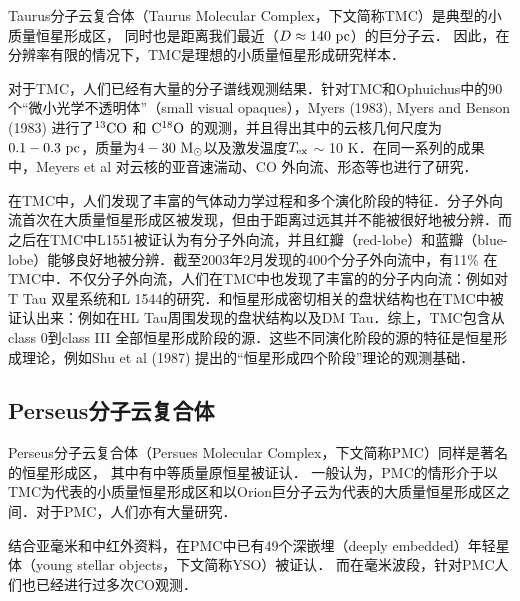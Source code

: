 \documentclass[UTF8, nocolorlinks]{pkuthss}
\newcommand{\cob}{$\rm ^{13}CO$ }
\newcommand{\coc}{$\rm C^{18}O$ }
\newcommand{\texc}{$T_{\rm {ex}}$ }
\begin{document}
			Taurus分子云复合体（Taurus Molecular Complex，下文简称TMC）是典型的小质量恒星形成区， 同时也是距离我们最近（$D\approx 140\rm\ pc$）的巨分子云\supercite{1987ApJ...322..706D}． 因此，在分辨率有限的情况下，TMC是理想的小质量恒星形成研究样本．

			对于TMC，人们已经有大量的分子谱线观测结果．针对TMC和Ophuichus中的90个“微小光学不透明体”（small visual opaques），Myers (1983), Myers and Benson (1983) 进行了\cob 和 \coc 的观测，并且得出其中的云核几何尺度为$0.1-0.3 \ \rm pc$，质量为$4-30\ \rm M_\odot$以及激发温度\texc $\sim$ 10 K\supercite{1983ApJ...264..517M,1983ApJ...266..309M}．在同一系列的成果中，Meyers et al 对云核的亚音速湍动、CO 外向流、形态等也进行了研究\supercite{1983ApJ...270..105M,1988ApJ...324..907M,1991ApJ...376..561M}．

			在TMC中，人们发现了丰富的气体动力学过程和多个演化阶段的特征．分子外向流首次在大质量恒星形成区被发现，但由于距离过远其并不能被很好地被分辨\supercite{1976ApJ...209L.137Z}．而之后在TMC中L1551被证认为有分子外向流，并且红瓣（red-lobe）和蓝瓣（blue-lobe）能够良好地被分辨\supercite{1980ApJ...239L..17S}．截至2003年2月发现的400个分子外向流中，有11\% 在TMC中\supercite{2004A&A...426..503W}．不仅分子外向流，人们在TMC中也发现了丰富的的分子内向流：例如对T Tau 双星系统\supercite{1994ApJ...425L..45V}和L 1544的研究\supercite{1998ApJ...504..900T}．和恒星形成密切相关的盘状结构也在TMC中被证认出来：例如在HL Tau周围发现的盘状结构\supercite{1991ApJ...382L..31S}以及DM Tau\supercite{1995ApJ...453..384S}．综上，TMC包含从class 0到class III 全部恒星形成阶段的源．这些不同演化阶段的源的特征是恒星形成理论，例如Shu et al (1987) 提出的“恒星形成四个阶段”理论\supercite{shu1987star}的观测基础．

		\subsection{Perseus分子云复合体}

			Perseus分子云复合体（Persues Molecular Complex，下文简称PMC）同样是著名的恒星形成区， 其中有中等质量原恒星被证认\supercite{2010A&A...512A..67L}． 一般认为，PMC的情形介于以TMC为代表的小质量恒星形成区和以Orion巨分子云为代表的大质量恒星形成区之间\supercite{2010ApJ...711..655J}．对于PMC，人们亦有大量研究．

			结合亚毫米和中红外资料，在PMC中已有49个深嵌埋（deeply embedded）年轻星体（young stellar objects，下文简称YSO）被证认\supercite{2007ApJ...656..293J}． 而在毫米波段，针对PMC人们也已经进行过多次CO观测\supercite{1979ApJ...233..163S,1999ApJ...525..318P, 2005A&A...440..151H}．
\end{document}
